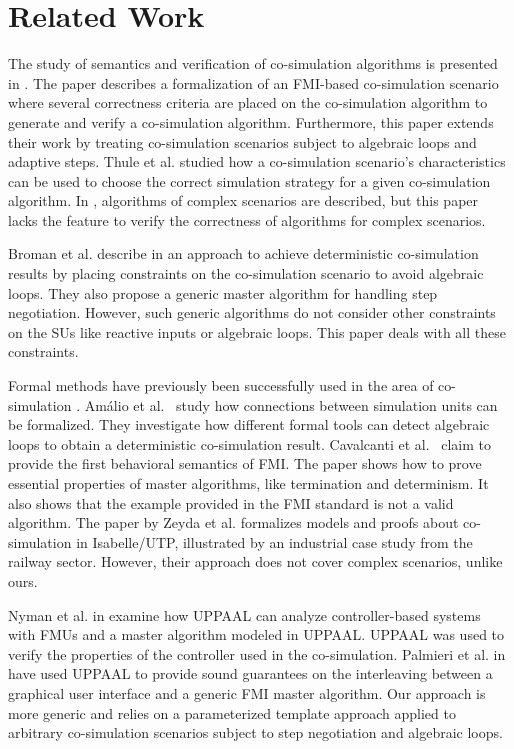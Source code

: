 \section{Related Work}\label{sc:related}
The study of semantics and verification of co-simulation algorithms is presented in \cite{Gomes2019c,Gomes2019a,Broman2013}. 
The paper \cite{Gomes2019c} describes a formalization of an FMI-based co-simulation scenario where several correctness criteria are placed on the co-simulation algorithm to generate and verify a co-simulation algorithm. 
Furthermore, this paper extends their work by treating co-simulation scenarios subject to algebraic loops and adaptive steps.
Thule et al. \cite{Thule_2018} studied how a co-simulation scenario's characteristics can be used to choose the correct simulation strategy for a given co-simulation algorithm. In \cite{thrane2021}, algorithms of complex scenarios are described, but this paper lacks the feature to verify the correctness of algorithms for complex scenarios.

Broman et al. describe in \cite{Broman2013} an approach to achieve deterministic co-simulation results by placing constraints on the co-simulation scenario to avoid algebraic loops. 
They also propose a generic master algorithm for handling step negotiation. 
However, such generic algorithms do not consider other constraints on the SUs like reactive inputs or algebraic loops. This paper deals with all these constraints.

Formal methods have previously been successfully used in the area of co-simulation \cite{Amalio2016,sampaio_behavioural_2016,cerone_formalising_2018}.
Amálio et al.\ \cite{Amalio2016} study how connections between simulation units can be formalized. They investigate how different formal tools can detect algebraic loops to obtain a deterministic co-simulation result. 
Cavalcanti et al.\ \cite{sampaio_behavioural_2016} claim to provide the first behavioral semantics of FMI. The paper shows how to prove essential properties of master algorithms, like termination and determinism. It also shows that the example provided in the FMI standard is not a valid algorithm. The paper \cite{cerone_formalising_2018} by Zeyda et al. formalizes models and proofs about co-simulation in Isabelle/UTP, illustrated by an industrial case study from the railway sector. 
However, their approach does not cover complex scenarios, unlike ours.

Nyman et al. in \cite{jensen_integrating_2017} examine how UPPAAL can analyze controller-based systems with FMUs and a master algorithm modeled in UPPAAL. UPPAAL was used to verify the properties of the controller used in the co-simulation. Palmieri et al. in \cite{palmieri2019framework} have used UPPAAL to provide sound guarantees on the interleaving between a graphical user interface and a generic FMI master algorithm. 
Our approach is more generic and relies on a parameterized template approach applied to arbitrary co-simulation scenarios subject to step negotiation and algebraic loops.


